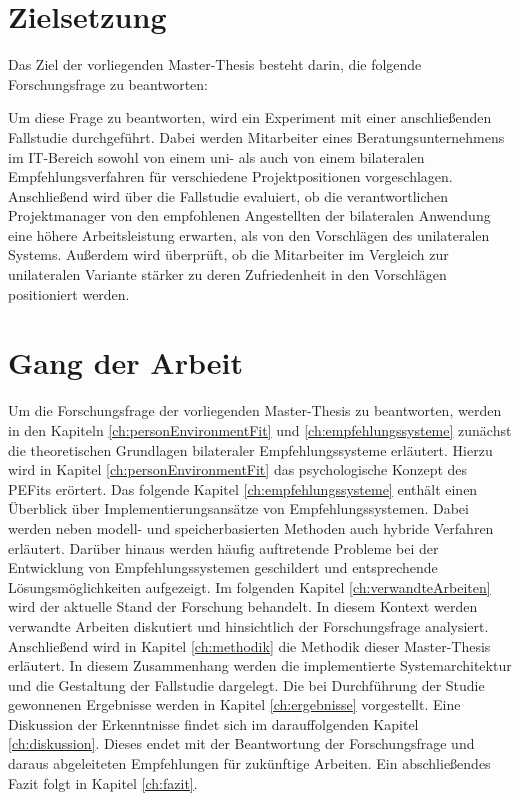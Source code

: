 \newpage
\section{Zielsetzung}
\label{sec:intro:zielsetzung}
Das Ziel der vorliegenden Master-Thesis besteht darin, die folgende Forschungsfrage zu beantworten:

\forschungsfrage

Um diese Frage zu beantworten, wird ein Experiment mit einer anschließenden Fallstudie durchgeführt. Dabei werden Mitarbeiter eines Beratungsunternehmens im IT-Bereich sowohl von einem uni- als auch von einem bilateralen Empfehlungsverfahren für verschiedene Projektpositionen vorgeschlagen. Anschließend wird über die Fallstudie evaluiert, ob die verantwortlichen Projektmanager von den empfohlenen Angestellten der bilateralen Anwendung eine höhere Arbeitsleistung erwarten, als von den Vorschlägen des unilateralen Systems. Außerdem wird überprüft, ob die Mitarbeiter im Vergleich zur unilateralen Variante stärker zu deren Zufriedenheit in den Vorschlägen positioniert werden.

\section{Gang der Arbeit}
\label{sec:intro:gangDerArbeit}
Um die Forschungsfrage der vorliegenden Master-Thesis zu beantworten, werden in den Kapiteln \ref{ch:personEnvironmentFit} und \ref{ch:empfehlungssysteme} zunächst die theoretischen Grundlagen bilateraler Empfehlungssysteme erläutert. Hierzu wird in Kapitel \ref{ch:personEnvironmentFit} das psychologische Konzept des \acp{PEFit} erörtert. Das folgende Kapitel \ref{ch:empfehlungssysteme} enthält einen Überblick über Implementierungsansätze von Empfehlungssystemen. Dabei werden neben modell- und speicherbasierten Methoden auch hybride Verfahren erläutert. Darüber hinaus werden häufig auftretende Probleme bei der Entwicklung von Empfehlungssystemen geschildert und entsprechende Lösungsmöglichkeiten aufgezeigt. Im folgenden Kapitel \ref{ch:verwandteArbeiten} wird der aktuelle Stand der Forschung behandelt. In diesem Kontext werden verwandte Arbeiten diskutiert und hinsichtlich der Forschungsfrage analysiert. Anschließend wird in Kapitel \ref{ch:methodik} die Methodik dieser Master-Thesis erläutert. In diesem Zusammenhang werden die implementierte Systemarchitektur und die Gestaltung der Fallstudie dargelegt. Die bei Durchführung der Studie gewonnenen Ergebnisse werden in Kapitel \ref{ch:ergebnisse} vorgestellt. Eine Diskussion der Erkenntnisse findet sich im darauffolgenden Kapitel \ref{ch:diskussion}. Dieses endet mit der Beantwortung der Forschungsfrage und daraus abgeleiteten Empfehlungen für zukünftige Arbeiten. Ein abschließendes Fazit folgt in Kapitel \ref{ch:fazit}.
